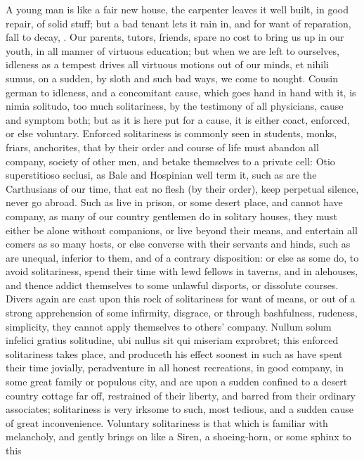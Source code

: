 {A young man is like a fair new house, the carpenter leaves it well
built, in good repair, of solid stuff; but a bad tenant lets it rain
in, and for want of reparation, fall to decay, \etc{}. Our parents, tutors,
friends, spare no cost to bring us up in our youth, in all manner of
virtuous education; but when we are left to ourselves, idleness as a
tempest drives all virtuous motions out of our minds, et nihili sumus,
on a sudden, by sloth and such bad ways, we come to nought.
Cousin german to idleness, and a concomitant cause, which goes hand in
hand with it, is nimia solitudo, too much solitariness, by the
testimony of all physicians, cause and symptom both; but as it is here
put for a cause, it is either coact, enforced, or else voluntary.
Enforced solitariness is commonly seen in students, monks, friars,
anchorites, that by their order and course of life must abandon all
company, society of other men, and betake themselves to a private cell:
Otio superstitioso seclusi, as Bale and Hospinian well term it, such as
are the Carthusians of our time, that eat no flesh (by their order),
keep perpetual silence, never go abroad. Such as live in prison, or
some desert place, and cannot have company, as many of our country
gentlemen do in solitary houses, they must either be alone without
companions, or live beyond their means, and entertain all comers as so
many hosts, or else converse with their servants and hinds, such as are
unequal, inferior to them, and of a contrary disposition: or else as
some do, to avoid solitariness, spend their time with lewd fellows in
taverns, and in alehouses, and thence addict themselves to some
unlawful disports, or dissolute courses. Divers again are cast upon
this rock of solitariness for want of means, or out of a strong
apprehension of some infirmity, disgrace, or through bashfulness,
rudeness, simplicity, they cannot apply themselves to others' company.
Nullum solum infelici gratius solitudine, ubi nullus sit qui miseriam
exprobret; this enforced solitariness takes place, and produceth his
effect soonest in such as have spent their time jovially, peradventure
in all honest recreations, in good company, in some great family or
populous city, and are upon a sudden confined to a desert country
cottage far off, restrained of their liberty, and barred from their
ordinary associates; solitariness is very irksome to such, most
tedious, and a sudden cause of great inconvenience.
Voluntary solitariness is that which is familiar with melancholy, and
gently brings on like a Siren, a shoeing-horn, or some sphinx to this
}
